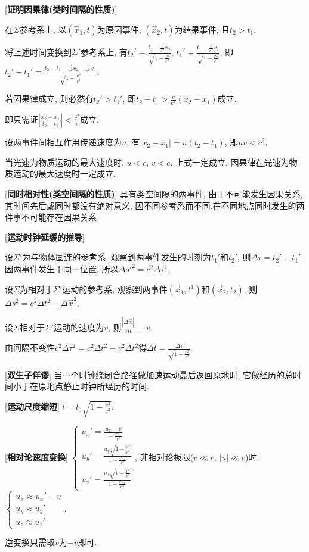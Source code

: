 [\textbf{证明因果律(类时间隔的性质)}]\par
\qquad 在$\Sigma$参考系上, 以$(\vec x_1,t)$为原因事件, $(\vec x_2,t)$为结果事件, 且$t_2>t_1$.\par
\qquad 将上述时间变换到$\Sigma'$参考系上, 有$t_2'=\frac{t_2-\frac{v}{c^2}x_2}{\sqrt{1-\frac{v^2}{c^2}}}$, $t_1'=\frac{t_1-\frac{v}{c^2}x_1}{\sqrt{1-\frac{v^2}{c^2}}}$, 即$t_2'-t_1'=\frac{t_2-t_1-\frac{v}{c^2}x_2+\frac{v}{c^2}x_1}{\sqrt{1-\frac{v^2}{c^2}}}$.\par
\qquad 若因果律成立, 则必然有$t_2'>t_1'$, 即$t_2-t_1>\frac{v}{c^2}(x_2-x_1)$成立.\par
\qquad 即只需证$\left|\frac{x_2-x_1}{t_2-t_1}\right|<\frac{c^2}{v}$成立.\par
\qquad 设两事件间相互作用传递速度为$u$, 有$|x_2-x_1|=u(t_2-t_1)$, 即$uv<c^2$.\par
\qquad 当光速为物质运动的最大速度时, $u<c$, $v<c$. 上式一定成立.
\qquad 因果律在光速为物质运动的最大速度时一定成立.

[\textbf{同时相对性(类空间隔的性质)}] 具有类空间隔的两事件, 由于不可能发生因果关系, 其时间先后或同时都没有绝对意义, 因不同参考系而不同.在不同地点同时发生的两件事不可能存在因果关系.\par

[\textbf{运动时钟延缓的推导}]\par
\qquad 设$\Sigma'$为与物体固连的参考系, 观察到两事件发生的时刻为$t_1'$和$t_2'$, 则$\Delta\tau=t_2'-t_1'$. 因两事件发生于同一位置, 所以$\Delta s'^2=c^2\Delta\tau^2$.\par
\qquad 设$\Sigma$为相对于$\Sigma'$运动的参考系, 观察到两事件$(\vec x_1,t^1)$和$(\vec x_2,t_2)$, 则$\Delta s^2=c^2\Delta t^2-\Delta \vec x^2$.\par
\qquad 设$\Sigma$相对于$\Sigma'$运动的速度为$v$, 则$\frac{|\Delta \vec x|}{\Delta t}=v$.\par
\qquad 由间隔不变性$c^2\Delta\tau^2=c^2\Delta t^2-v^2\Delta t^2$得$\Delta t=\frac{\Delta\tau}{\sqrt{1-\frac{v^2}{c^2}}}$.\par

[\textbf{双生子佯谬}] 当一个时钟绕闭合路径做加速运动最后返回原地时, 它做经历的总时间小于在原地点静止时钟所经历的时间.\par

\clearpage

[\textbf{运动尺度缩短}] $l=l_0\sqrt{1-\frac{v^2}{c^2}}$.\par

[\textbf{相对论速度变换}] $\begin{cases}u_x'=\frac{u_x-v}{1-\frac{vu_x}{c^2}}\\u_y'=\frac{u_y\sqrt{1-\frac{v^2}{c^2}}}{1-\frac{vu_x}{c^2}}\\u_z'=\frac{u_z\sqrt{1-\frac{v^2}{c^2}}}{1-\frac{vu_x}{c^2}}\end{cases}$, 非相对论极限($v\ll c$, $|u|\ll c$)时: $\begin{cases}u_x\approx u_x'-v\\u_y\approx u_y'\\u_z\approx u_z'\end{cases}$.\par
\qquad 逆变换只需取$v$为$-v$即可.\par

